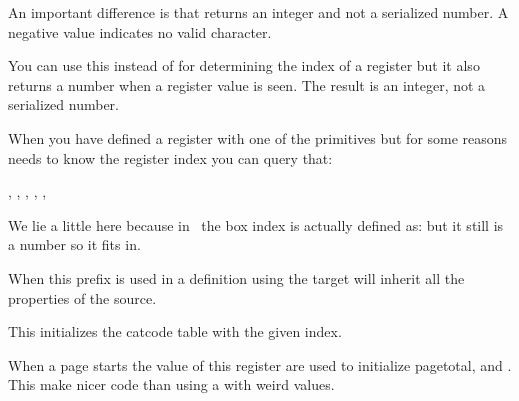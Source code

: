 \starttyping
\chardef    {}
\mathchardef{}

\the\indexofcharacter \foo
\the\indexofcharacter \oof
\stoptyping

An important difference is that  returns an integer and
not a serialized number. A negative value indicates no valid character.

\stopnewprimitive

\startnewprimitive[title={\prm {indexofregister}}]

You can use this instead of  for determining the index of a register
but it also returns a number when a register value is seen. The result is an
integer, not a serialized number.

When you have defined a register with one of the  primitives but for
some reasons needs to know the register index you can query that:

\startbuffer
\the\indexofregister \scratchcounterone,
\the\indexofregister \scratchcountertwo,
\the\indexofregister \scratchwidth,
\the\indexofregister \scratchheight,
\the\indexofregister \scratchdepth,
\the\indexofregister \scratchbox
\stopbuffer

\typebuffer


We lie a little here because in \CONTEXT\ the box index  is
actually defined as: \expanded {\typ {\meaningasis \scratchbox}} but it
still is a number so it fits in.

\getbuffer

\stopnewprimitive

\startnewprimitive[title={\prm {inherited}}]

When this prefix is used in a definition using  the target will inherit
all the properties of the source.

\stopnewprimitive

\startnewprimitive[title={\prm {initcatcodetable}}]

This initializes the catcode table with the given index.

\stopnewprimitive

\startnewprimitive[title={\prm {initialpageskip}}]

When a page starts the value of this register are used to initialize \prm
{pagetotal},  and . This make nicer code than
using a  with weird values.

